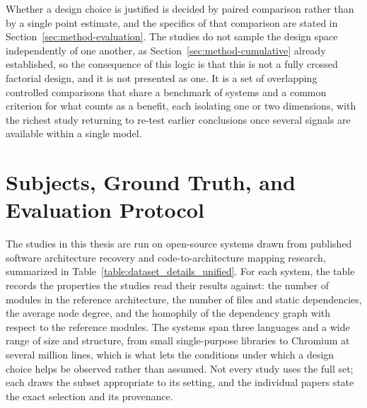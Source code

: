 Whether a design choice is justified is decided by paired comparison rather than by a single point estimate, and the specifics of that comparison are stated in Section~\ref{sec:method-evaluation}. The studies do not sample the design space independently of one another, as Section~\ref{sec:method-cumulative} already established, so the consequence of this logic is that this is not a fully crossed factorial design, and it is not presented as one. It is a set of overlapping controlled comparisons that share a benchmark of systems and a common criterion for what counts as a benefit, each isolating one or two dimensions, with the richest study returning to re-test earlier conclusions once several signals are available within a single model.

\section{Subjects, Ground Truth, and Evaluation Protocol}
\label{sec:data}

The studies in this thesis are run on open-source systems drawn from published software architecture recovery and code-to-architecture mapping research, summarized in Table~\ref{table:dataset_details_unified}. For each system, the table records the properties the studies read their results against: the number of modules in the reference architecture, the number of files and static dependencies, the average node degree, and the homophily of the dependency graph with respect to the reference modules. The systems span three languages and a wide range of size and structure, from small single-purpose libraries to Chromium at several million lines, which is what lets the conditions under which a design choice helps be observed rather than assumed. Not every study uses the full set; each draws the subset appropriate to its setting, and the individual papers state the exact selection and its provenance.

